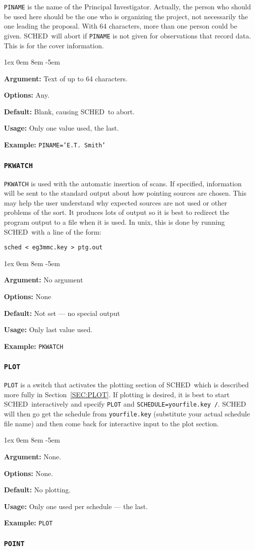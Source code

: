\documentclass{report}
\newcommand{\schedb}{{\sc SCHED~}}
\newcommand{\rcwbox}[5]{
  \begin{list}{}{\parsep 1ex  \itemsep 0em
                 \leftmargin 8em  \itemindent -5em }
    \item {\bf Argument:} #1
    \item {\bf Options:}  #2
    \item {\bf Default:}  #3
    \item {\bf Usage:}    #4
    \item {\bf Example:}  #5
  \end{list}
}
\begin{document}
{\tt PINAME} is the name of the Principal Investigator.  Actually,
the person who should be used here should be the one who is organizing
the project, not necessarily the one leading the proposal.  With 64
characters, more than one person could be given. \schedb will
abort if {\tt PINAME} is not given for observations that record data.
This is for the cover information.

\rcwbox
{Text of up to 64 characters.}
{Any.}
{Blank, causing \schedb to abort.}
{Only one value used, the last.}
{{\tt PINAME='E.T. Smith'}}


\subsubsection{\label{MP:PKWATCH}{\tt PKWATCH}}

{\tt PKWATCH} is used with the automatic insertion of  scans.  If specified, information will be sent
to the standard output about how pointing sources are chosen.  This
may help the user understand why expected sources are not used or
other problems of the sort.  It produces lots of output so it is best
to redirect the program output to a file when it is used.  In unix, this
is done by running \schedb with a line of the form:

{\tt sched < eg3mmc.key > ptg.out}

\rcwbox
{No argument}
{None}
{Not set --- no special output}
{Only last value used.}
{{\tt PKWATCH}}


\subsubsection{\label{MP:PLOT}{\tt PLOT}}

{\tt PLOT} is a switch that activates the plotting section of
\schedb which is described more fully in Section~\ref{SEC:PLOT}.
If plotting is desired, it is best to start \schedb interactively
and specify {\tt PLOT} and {\tt SCHEDULE=yourfile.key /}.  \schedb
will then go get the schedule from {\tt yourfile.key} (substitute
your actual schedule file name) and then come back for interactive
input to the plot section.

\rcwbox
{None.}
{None.}
{No plotting.}
{Only one used per schedule --- the last.}
{{\tt PLOT}}


\subsubsection{\label{MP:POINT}{\tt POINT}}
\end{document}
